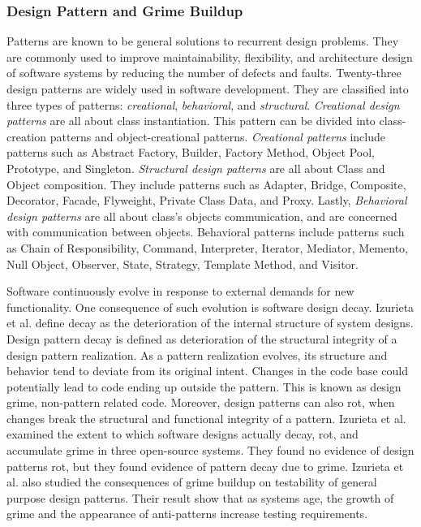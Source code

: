 \subsubsection{Design Pattern and Grime Buildup}
Patterns are known to be general solutions to recurrent design problems. They are commonly used to improve maintainability, flexibility, and architecture design of software systems by reducing the number of defects and faults. Twenty-three design patterns are widely used in software development. They are classified into three types of patterns\cite{Desig53:online}: \textit{creational}, \textit{behavioral}, and \textit{structural}. \textit{Creational design patterns} are all about class instantiation. This pattern can be divided into class-creation patterns and object-creational patterns. \textit{Creational patterns} include patterns such as Abstract Factory, Builder, Factory Method, Object Pool, Prototype, and Singleton\cite{Desig53:online}. \textit{Structural design patterns} are all about Class and Object composition. They include patterns such as Adapter, Bridge, Composite, Decorator, Facade, Flyweight, Private Class Data, and Proxy\cite{Desig53:online}. Lastly, \textit{Behavioral design patterns} are all about class's objects communication, and are concerned with communication between objects. Behavioral patterns include patterns such as Chain of Responsibility, Command, Interpreter, Iterator, Mediator, Memento, Null Object, Observer, State, Strategy, Template Method, and Visitor\cite{Desig53:online}. 

Software continuously evolve in response to external demands for new functionality. One consequence of such evolution is software design decay. Izurieta et al.\cite{izurieta2007software} define decay as the deterioration of the internal structure of system designs. Design pattern decay is defined as deterioration of the structural integrity of a design pattern realization. As a pattern realization evolves, its structure and behavior tend to deviate from its original intent. Changes in the code base could potentially lead to code ending up outside the pattern. This is known as design grime, non-pattern related code\cite{izurieta2007software}. Moreover, design patterns can also rot, when changes break the structural and functional integrity of a pattern\cite{izurieta2007software}. Izurieta et al.\cite{izurieta2013multiple} examined the extent to which software designs actually decay, rot, and accumulate grime in three open-source systems. They found no evidence of design patterns rot, but they found evidence of pattern decay due to grime. Izurieta et al.\cite{izurieta2008testing} also studied the consequences of grime buildup on testability of general purpose design patterns. Their result show that as systems age, the growth of grime and the appearance of anti-patterns increase testing requirements.



